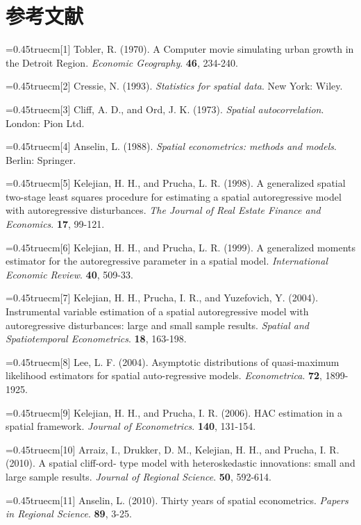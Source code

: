 \documentclass[onecolumn]{ctexart}	%
\def\nh{\noindent\hangindent=0.45truecm\hangafter=1}
\begin{document}
\section*{参考文献}

%

\noindent
\nh [1] Tobler, R. (1970). A Computer movie simulating urban growth in the Detroit Region. \textit{Economic Geography}. \textbf{46}, 234-240.

\nh[2] Cressie, N. (1993). \textit{Statistics for spatial data}. New York: Wiley.

\nh [3] Cliff, A. D., and Ord, J. K. (1973). \textit{Spatial autocorrelation}. London: Pion Ltd.

\nh [4] Anselin, L. (1988). \textit{Spatial econometrics: methods and models}.  Berlin: Springer.

\nh [5] Kelejian, H. H., and Prucha, L. R. (1998). A generalized spatial two-stage least squares procedure for estimating a spatial autoregressive model with autoregressive disturbances. \textit{The Journal of Real Estate Finance and Economics}. \textbf{17},  99-121.

\nh [6] Kelejian, H. H., and Prucha, L. R.  (1999). A generalized moments estimator for the autoregressive
parameter in a spatial model. \textit{International Economic Review}. \textbf{40},  509-33. 

\nh [7] Kelejian, H. H., Prucha, I. R., and Yuzefovich, Y. (2004). Instrumental variable estimation of a spatial autoregressive model with autoregressive disturbances: large and small sample results. \textit{Spatial and Spatiotemporal Econometrics}. \textbf{18},  163-198. 

\nh [8] Lee, L. F. (2004). Asymptotic distributions of quasi-maximum likelihood estimators for spatial auto-regressive models. \textit{Econometrica}. \textbf{72}, 1899-1925.

\nh [9] Kelejian, H. H., and Prucha, I. R. (2006). HAC estimation in a spatial framework.  \textit{Journal of Econometrics}. \textbf{140},  131-154.

\nh [10] Arraiz, I., Drukker, D. M., Kelejian, H. H., and Prucha, I. R. (2010). A spatial cliff-ord- type model with heteroskedastic innovations: small and large sample results. \textit{Journal of Regional Science}. \textbf{50},  592-614.

\nh [11] Anselin, L. (2010). Thirty years of spatial econometrics. \textit{Papers in Regional Science}. \textbf{89},  3-25.
\end{document}
